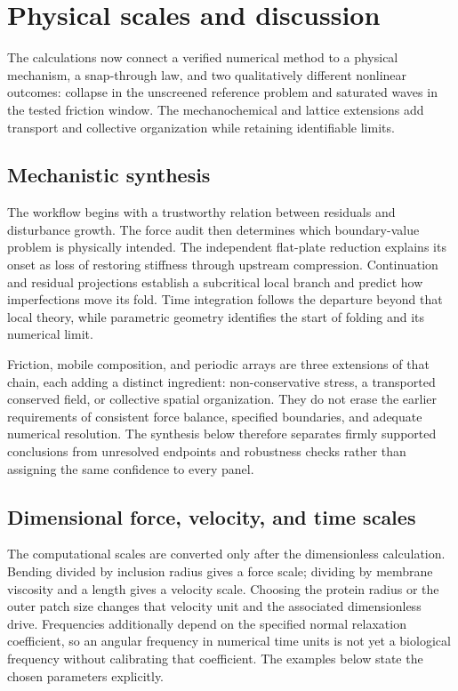 \section{Physical scales and discussion}\label{sec:discussion}
The calculations now connect a verified numerical method to a physical mechanism, a snap-through law, and two qualitatively different nonlinear outcomes: collapse in the unscreened reference problem and saturated waves in the tested friction window. The mechanochemical and lattice extensions add transport and collective organization while retaining identifiable limits.


\subsection{Mechanistic synthesis}
The workflow begins with a trustworthy relation between residuals and disturbance growth. The force audit then determines which boundary-value problem is physically intended. The independent flat-plate reduction explains its onset as loss of restoring stiffness through upstream compression. Continuation and residual projections establish a subcritical local branch and predict how imperfections move its fold. Time integration follows the departure beyond that local theory, while parametric geometry identifies the start of folding and its numerical limit.

Friction, mobile composition, and periodic arrays are three extensions of that chain, each adding a distinct ingredient: non-conservative stress, a transported conserved field, or collective spatial organization. They do not erase the earlier requirements of consistent force balance, specified boundaries, and adequate numerical resolution. The synthesis below therefore separates firmly supported conclusions from unresolved endpoints and robustness checks rather than assigning the same confidence to every panel.


\subsection{Dimensional force, velocity, and time scales}


The computational scales are converted only after the dimensionless calculation. Bending divided by inclusion radius gives a force scale; dividing by membrane viscosity and a length gives a velocity scale. Choosing the protein radius or the outer patch size changes that velocity unit and the associated dimensionless drive. Frequencies additionally depend on the specified normal relaxation coefficient, so an angular frequency in numerical time units is not yet a biological frequency without calibrating that coefficient. The examples below state the chosen parameters explicitly.


